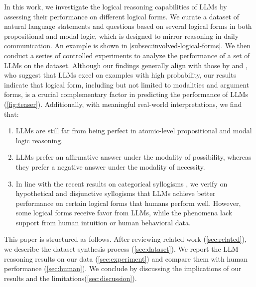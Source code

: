 In this work, we investigate the logical reasoning capabilities of LLMs by assessing their performance on different logical forms.
We curate a dataset of natural language statements and questions based on several logical forms in both propositional and modal logic, which is designed to mirror reasoning in daily communication.
An example is shown in \cref{subsec:involved-logical-forms}.
We then conduct a series of controlled experiments to analyze the performance of a set of LLMs on the dataset.
Although our findings generally align with those by \citet{gonen-etal-2023-demystifying} and \citet{mccoyEmbersAutoregressionShow2024}, who suggest that LLMs excel on examples with high probability, our results indicate that logical form, including but not limited to modalities and argument forms, is a crucial complementary factor in predicting the performance of LLMs (\cref{fig:teaser}).
Additionally, with meaningful real-world interpretations, we find that:
\begin{enumerate}[topsep=2pt, itemsep=-3pt, parsep=0.5em, leftmargin=*]
    \item LLMs are still far from being perfect in atomic-level propositional and modal logic reasoning.
    \item LLMs prefer an affirmative answer under the modality of possibility, whereas they prefer a negative answer under the modality of necessity.
    \item In line with the recent results on categorical syllogisms \citep{eisape-etal-2024-systematic}, we verify on hypothetical and disjunctive syllogisms that LLMs achieve better performance on certain logical forms that humans perform well.
          However, some logical forms receive favor from LLMs, while the phenomena lack support from human intuition or human behavioral data.
\end{enumerate}
This paper is structured as follows.
After reviewing related work (\cref{sec:related}), we describe the dataset synthesis process (\cref{sec:dataset}).
We report the LLM reasoning results on our data (\cref{sec:experiment}) and compare them with human performance (\cref{sec:human}).
We conclude by discussing the implications of our results and the limitations(\cref{sec:discussion}).
